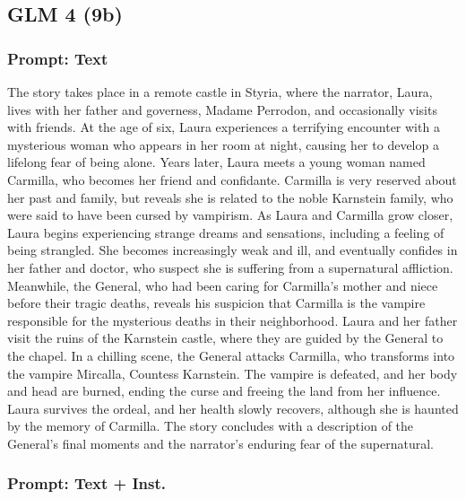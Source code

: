 \documentclass{article} %
\begin{document}
\subsection{GLM 4 (9b)}

\subsubsection{Prompt: Text}

The story takes place in a remote castle in Styria, where the narrator, Laura, lives with her father and governess, Madame Perrodon, and occasionally visits with friends. At the age of six, Laura experiences a terrifying encounter with a mysterious woman who appears in her room at night, causing her to develop a lifelong fear of being alone. Years later, Laura meets a young woman named Carmilla, who becomes her friend and confidante. Carmilla is very reserved about her past and family, but reveals she is related to the noble Karnstein family, who were said to have been cursed by vampirism. As Laura and Carmilla grow closer, Laura begins experiencing strange dreams and sensations, including a feeling of being strangled. She becomes increasingly weak and ill, and eventually confides in her father and doctor, who suspect she is suffering from a supernatural affliction. Meanwhile, the General, who had been caring for Carmilla's mother and niece before their tragic deaths, reveals his suspicion that Carmilla is the vampire responsible for the mysterious deaths in their neighborhood. Laura and her father visit the ruins of the Karnstein castle, where they are guided by the General to the chapel. In a chilling scene, the General attacks Carmilla, who transforms into the vampire Mircalla, Countess Karnstein. The vampire is defeated, and her body and head are burned, ending the curse and freeing the land from her influence. Laura survives the ordeal, and her health slowly recovers, although she is haunted by the memory of Carmilla. \textcolor{skipred}{The story concludes with a description of the General's final moments and the narrator's enduring fear of the supernatural.}

\subsubsection{Prompt: Text + Inst.}
\end{document}
